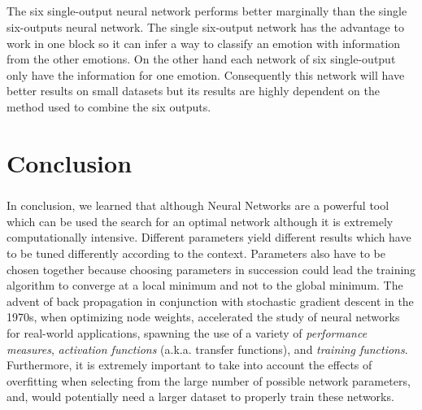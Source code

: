 \documentclass[a4paper,12pt,oneside,final]{report}
\begin{document}
\paragraph{}
The six single-output neural network performs better marginally than the single six-outputs neural network. The single six-output network has the advantage to work in one block so it can infer a way to classify an emotion with information from the other emotions. On the other hand each network of six single-output only have the information for one emotion. Consequently this network will have better results on small datasets but its results are highly dependent on the method used to combine the six outputs.
\chapter{Conclusion}
\paragraph{}
In conclusion, we learned that although Neural Networks are a powerful tool which can be used the search for an optimal network although it is extremely computationally intensive.  Different parameters yield different results which have to be tuned differently according to the context. Parameters also have to be chosen together because choosing parameters in succession could lead the training algorithm to converge at a local minimum and not to the global minimum. The advent of back propagation in conjunction with stochastic gradient descent in the 1970s, when optimizing node weights, accelerated the study of neural networks for real-world applications, spawning the use of a variety of \emph{performance measures}, \emph{activation functions} (a.k.a. transfer functions), and \emph{training functions}.  Furthermore, it is extremely important to take into account the effects of overfitting when selecting from the large number of possible network parameters, and, would potentially need a larger dataset to properly train these networks.




\begin{appendices}

\end{appendices}
\end{document}
